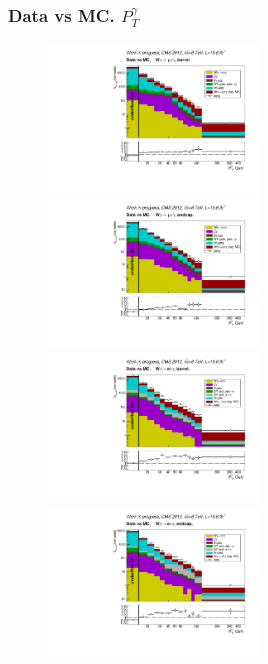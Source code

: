 \begin{frame}\frametitle{Data vs MC. $P_T^{\gamma}$}
\scriptsize
  \begin{figure}[htb]
    \begin{center}
       \includegraphics[width=0.5\textwidth]{../figs/figs_v11/MUON_WGamma/PrepareYields/c_TotalDATAvsMC_Barrel__phoEt.pdf} \includegraphics[width=0.5\textwidth]{../figs/figs_v11/MUON_WGamma/PrepareYields/c_TotalDATAvsMC_Endcap__phoEt.pdf}\\
       \includegraphics[width=0.5\textwidth]{../figs/figs_v11/ELECTRON_WGamma/PrepareYields/c_TotalDATAvsMC_Barrel__phoEt.pdf} \includegraphics[width=0.5\textwidth]{../figs/figs_v11/ELECTRON_WGamma/PrepareYields/c_TotalDATAvsMC_Endcap__phoEt.pdf}\\
    \end{center}
  \end{figure}
\end{frame}

